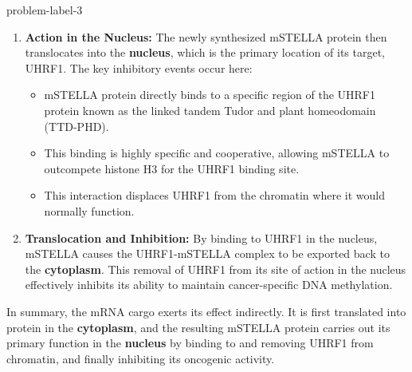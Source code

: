 \begin{multicols}{2}
\begin{problem}{}{problem-label-3}
\begin{enumerate}
        \item \textbf{Action in the Nucleus:} The newly synthesized mSTELLA protein then translocates into the \textbf{nucleus}, which is the primary location of its target, UHRF1. The key inhibitory events occur here:
        \begin{itemize}
            \item mSTELLA protein directly binds to a specific region of the UHRF1 protein known as the linked tandem Tudor and plant homeodomain (TTD-PHD).
            \item This binding is highly specific and cooperative, allowing mSTELLA to outcompete histone H3 for the UHRF1 binding site.
            \item This interaction displaces UHRF1 from the chromatin where it would normally function.
        \end{itemize}
    
        \item \textbf{Translocation and Inhibition:} By binding to UHRF1 in the nucleus, mSTELLA causes the UHRF1-mSTELLA complex to be exported back to the \textbf{cytoplasm}. This removal of UHRF1 from its site of action in the nucleus effectively inhibits its ability to maintain cancer-specific DNA methylation.
    \end{enumerate}
    
    In summary, the mRNA cargo exerts its effect indirectly. It is first translated into protein in the \textbf{cytoplasm}, and the resulting mSTELLA protein carries out its primary function in the \textbf{nucleus} by binding to and removing UHRF1 from chromatin, and finally inhibiting its oncogenic activity.
      

\end{problem}

\end{multicols}

